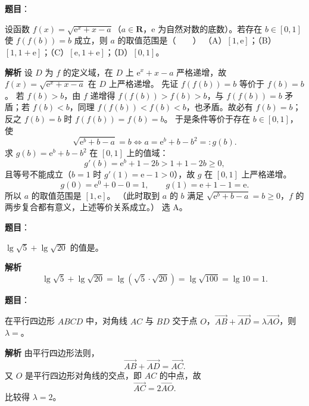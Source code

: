 \begin{answer}

\textbf{题目}：

设函数 $f(x)=\sqrt{\mathrm e^x+x-a}$（$a\in\mathbf R$，$\mathrm e$ 为自然对数的底数）。若存在 $b\in[0,1]$ 使 $f(f(b))=b$ 成立，则 $a$ 的取值范围是\mbox{（　　）}
（A）$[1,\mathrm e]$；（B）$[1,1+\mathrm e]$；（C）$[\mathrm e,1+\mathrm e]$；（D）$[0,1]$。

\textbf{解析}
设 $D$ 为 $f$ 的定义域，在 $D$ 上 $\mathrm e^x+x-a$ 严格递增，故 $f(x)=\sqrt{\mathrm e^x+x-a}$ 在 $D$ 上严格递增。
先证 $f(f(b))=b$ 等价于 $f(b)=b$。
若 $f(b)>b$，由 $f$ 递增得 $f(f(b))>f(b)>b$，与 $f(f(b))=b$ 矛盾；若 $f(b)<b$，同理 $f(f(b))<f(b)<b$，也矛盾。故必有 $f(b)=b$；反之 $f(b)=b$ 时 $f(f(b))=f(b)=b$。
于是条件等价于存在 $b\in[0,1]$，使
\nopagebreak[4]
\[\sqrt{\mathrm e^b+b-a}=b\iff a=\mathrm e^b+b-b^2=:g(b).\]
求 $g(b)=\mathrm e^b+b-b^2$ 在 $[0,1]$ 上的值域：
\nopagebreak[4]
\[g'(b)=\mathrm e^b+1-2b>1+1-2b\geqslant0,\]
且等号不能成立（$b=1$ 时 $g'(1)=\mathrm e-1>0$），故 $g$ 在 $[0,1]$ 上严格递增。
\nopagebreak[4]
\[g(0)=\mathrm e^0+0-0=1,\qquad g(1)=\mathrm e+1-1=\mathrm e.\]
所以 $a$ 的取值范围是 $[1,\mathrm e]$。
（此时取到 $a$ 的 $b$ 满足 $\sqrt{\mathrm e^b+b-a}=b\geqslant0$，$f$ 的两步复合都有意义，上述等价关系成立。）
选 A。


\end{answer}
\begin{answer}

\textbf{题目}：

$\lg\sqrt5+\lg\sqrt{20}$ 的值是\gkblank{}。

\textbf{解析}
\nopagebreak[4]
\[\lg\sqrt5+\lg\sqrt{20}=\lg\left(\sqrt5\cdot\sqrt{20}\right)=\lg\sqrt{100}=\lg10=1.\]


\end{answer}
\begin{answer}

\textbf{题目}：

在平行四边形 $ABCD$ 中，对角线 $AC$ 与 $BD$ 交于点 $O$，$\overrightarrow{AB}+\overrightarrow{AD}=\lambda\overrightarrow{AO}$，则 $\lambda=$\gkblank{}。
\nopagebreak[4]
\begin{center}\end{center}
\nopagebreak[4]
\textbf{解析}
由平行四边形法则，
\nopagebreak[4]
\[\overrightarrow{AB}+\overrightarrow{AD}=\overrightarrow{AC}.\]
又 $O$ 是平行四边形对角线的交点，即 $AC$ 的中点，故
\nopagebreak[4]
\[\overrightarrow{AC}=2\overrightarrow{AO}.\]
比较得 $\lambda=2$。


\end{answer}
